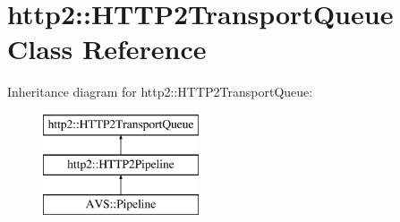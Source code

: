\hypertarget{classhttp2_1_1HTTP2TransportQueue}{}\section{http2\+:\+:H\+T\+T\+P2\+Transport\+Queue Class Reference}
\label{classhttp2_1_1HTTP2TransportQueue}
Inheritance diagram for http2\+:\+:H\+T\+T\+P2\+Transport\+Queue\+:\begin{figure}[H]
\begin{center}
\leavevmode
\includegraphics[height=3.000000cm]{d2/d72/classhttp2_1_1HTTP2TransportQueue}
\end{center}
\end{figure}
